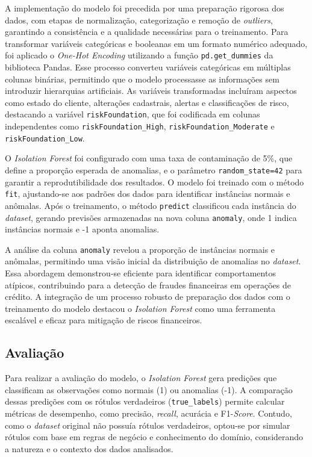 \documentclass[12pt,a4paper]{article}
\begin{document}
A implementação do modelo foi precedida por uma preparação rigorosa dos dados, com etapas de normalização, categorização e remoção de \textit{outliers}, garantindo a consistência e a qualidade necessárias para o treinamento. Para transformar variáveis categóricas e booleanas em um formato numérico adequado, foi aplicado o \textit{One-Hot Encoding} utilizando a função \texttt{pd.get\_dummies} da biblioteca Pandas. Esse processo converteu variáveis categóricas em múltiplas colunas binárias, permitindo que o modelo processasse as informações sem introduzir hierarquias artificiais. As variáveis transformadas incluíram aspectos como estado do cliente, alterações cadastrais, alertas e classificações de risco, destacando a variável \texttt{riskFoundation}, que foi codificada em colunas independentes como \texttt{riskFoundation\_High}, \texttt{riskFoundation\_Moderate} e \texttt{riskFoundation\_Low}.

O \textit{Isolation Forest} foi configurado com uma taxa de contaminação de 5\%, que define a proporção esperada de anomalias, e o parâmetro \texttt{random\_state=42} para garantir a reprodutibilidade dos resultados. O modelo foi treinado com o método \texttt{fit}, ajustando-se aos padrões dos dados para identificar instâncias normais e anômalas. Após o treinamento, o método \texttt{predict} classificou cada instância do \textit{dataset}, gerando previsões armazenadas na nova coluna \texttt{anomaly}, onde 1 indica instâncias normais e -1 aponta anomalias.

A análise da coluna \texttt{anomaly} revelou a proporção de instâncias normais e anômalas, permitindo uma visão inicial da distribuição de anomalias no \textit{dataset}. Essa abordagem demonstrou-se eficiente para identificar comportamentos atípicos, contribuindo para a detecção de fraudes financeiras em operações de crédito. A integração de um processo robusto de preparação dos dados com o treinamento do modelo destacou o \textit{Isolation Forest} como uma ferramenta escalável e eficaz para mitigação de riscos financeiros.

\subsection{Avaliação}

Para realizar a avaliação do modelo, o \textit{Isolation Forest} gera predições que classificam as observações como normais (1) ou anomalias (-1). A comparação dessas predições com os rótulos verdadeiros (\texttt{true\_labels}) permite calcular métricas de desempenho, como precisão, \textit{recall}, acurácia e F1-\textit{Score}. Contudo, como o \textit{dataset} original não possuía rótulos verdadeiros, optou-se por simular rótulos com base em regras de negócio e conhecimento do domínio, considerando a natureza e o contexto dos dados analisados.
\end{document}
